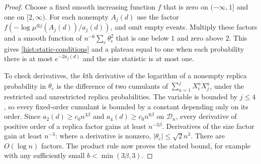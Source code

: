 \begin{proof}
Choose a fixed smooth increasing function $f$ that is zero on $(-\infty,1]$
and one on $[2,\infty)$.  For each nonempty $A_j(d)$ use the factor
$f(-\log\mu^{\otimes j}(A_j(d))/a_j(d))$, and omit empty events.  Multiply
these factors and a smooth function of $n^{-6}\sum_e\theta_e^2$ that is one
below $1$ and zero above $2$.  This gives \eqref{hist:static-conditions} and
a plateau equal to one when each probability there is at most $e^{-2a_j(d)}$
and the size statistic is at most one.

To check derivatives, the $k$th derivative of the logarithm of a nonempty
replica probability in $\theta_e$ is the difference of two cumulants of
$\sum_{a=1}^jX_i^aX_j^a$, under the restricted and unrestricted replica
probabilities.  The variable is bounded by $j\le4$, so every fixed-order
cumulant is bounded by a constant depending only on its order.  Since
$a_2(d)\ge c_0 n^{3\beta}$ and $a_4(d)\ge c_0 n^{8\beta}$ on
$\mathscr D_n$, every derivative of positive order of a replica factor gains at
least $n^{-3\beta}$.  Derivatives of the size factor gain at least $n^{-3}$:
where a derivative is nonzero, $|\theta_e|\le\sqrt2 n^3$.  There are
$O(\log n)$ factors.  The product rule now proves the stated bound, for
example with any sufficiently small $b<\min(3\beta,3)$.


\end{proof}
